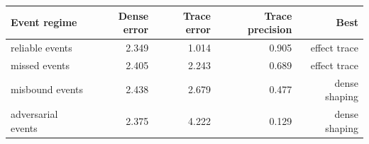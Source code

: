 \begin{tabular}{lrrrr}
\toprule
Event regime & Dense error & Trace error & Trace precision & Best \\
\midrule
reliable events & 2.349 & 1.014 & 0.905 & effect trace \\
missed events & 2.405 & 2.243 & 0.689 & effect trace \\
misbound events & 2.438 & 2.679 & 0.477 & dense shaping \\
adversarial events & 2.375 & 4.222 & 0.129 & dense shaping \\
\bottomrule
\end{tabular}
